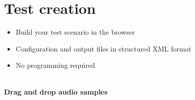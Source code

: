 \vspace{-0.8cm}
\section{Test creation} %

\begin{itemize}
	\item Build your test scenario in the browser
	\item Configuration and output files in structured XML format
	\item No programming required
\end{itemize}

\begin{center}
\\ %
\small
\textbf{Drag and drop audio samples}
\end{center}